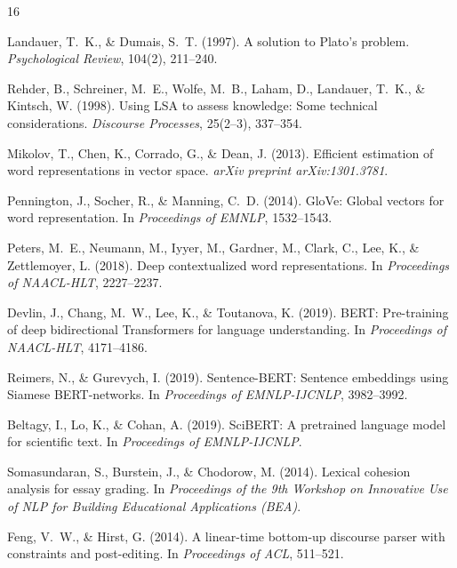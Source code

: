 \documentclass[11pt,a4paper]{article}
\begin{document}
\begin{thebibliography}{16}

Landauer, T.~K., \& Dumais, S.~T. (1997).
A solution to Plato's problem.
\emph{Psychological Review}, 104(2), 211--240.

Rehder, B., Schreiner, M.~E., Wolfe, M.~B., Laham, D., Landauer, T.~K., \& Kintsch, W. (1998).
Using LSA to assess knowledge: Some technical considerations.
\emph{Discourse Processes}, 25(2--3), 337--354.

Mikolov, T., Chen, K., Corrado, G., \& Dean, J. (2013).
Efficient estimation of word representations in vector space.
\emph{arXiv preprint arXiv:1301.3781}.

Pennington, J., Socher, R., \& Manning, C.~D. (2014).
GloVe: Global vectors for word representation.
In \emph{Proceedings of EMNLP}, 1532--1543.

Peters, M.~E., Neumann, M., Iyyer, M., Gardner, M., Clark, C., Lee, K., \& Zettlemoyer, L. (2018).
Deep contextualized word representations.
In \emph{Proceedings of NAACL-HLT}, 2227--2237.

Devlin, J., Chang, M.~W., Lee, K., \& Toutanova, K. (2019).
BERT: Pre-training of deep bidirectional Transformers for language understanding.
In \emph{Proceedings of NAACL-HLT}, 4171--4186.

Reimers, N., \& Gurevych, I. (2019).
Sentence-BERT: Sentence embeddings using Siamese BERT-networks.
In \emph{Proceedings of EMNLP-IJCNLP}, 3982--3992.

Beltagy, I., Lo, K., \& Cohan, A. (2019).
SciBERT: A pretrained language model for scientific text.
In \emph{Proceedings of EMNLP-IJCNLP}.

Somasundaran, S., Burstein, J., \& Chodorow, M. (2014).
Lexical cohesion analysis for essay grading.
In \emph{Proceedings of the 9th Workshop on Innovative Use of NLP for Building Educational Applications (BEA)}.

Feng, V.~W., \& Hirst, G. (2014).
A linear-time bottom-up discourse parser with constraints and post-editing.
In \emph{Proceedings of ACL}, 511--521.


\end{thebibliography}
\end{document}
